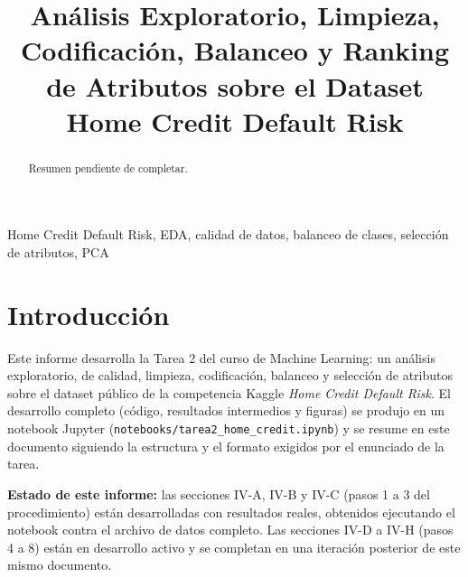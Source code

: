 \documentclass[conference]{IEEEtran}
\begin{document}
\title{Análisis Exploratorio, Limpieza, Codificación, Balanceo y Ranking\\
de Atributos sobre el Dataset Home Credit Default Risk}

\author{
}

\maketitle

\begin{abstract}
Resumen pendiente de completar.
\end{abstract}

\begin{IEEEkeywords}
Home Credit Default Risk, EDA, calidad de datos, balanceo de clases,
selección de atributos, PCA
\end{IEEEkeywords}

\section{Introducción}

Este informe desarrolla la Tarea 2 del curso de Machine Learning: un
análisis exploratorio, de calidad, limpieza, codificación, balanceo y
selección de atributos sobre el dataset público de la competencia Kaggle
\emph{Home Credit Default Risk}. El desarrollo completo (código,
resultados intermedios y figuras) se produjo en un notebook Jupyter
(\texttt{notebooks/tarea2\_home\_credit.ipynb}) y se resume en este
documento siguiendo la estructura y el formato exigidos por el enunciado
de la tarea.

\textbf{Estado de este informe:} las secciones IV-A, IV-B y IV-C
(pasos 1 a 3 del procedimiento) están desarrolladas con resultados reales,
obtenidos ejecutando el notebook contra el archivo de datos completo. Las
secciones IV-D a IV-H (pasos 4 a 8) están en desarrollo activo y se
completan en una iteración posterior de este mismo documento.
\end{document}

